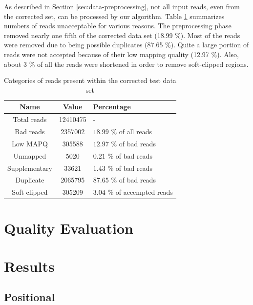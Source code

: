 As described in Section \ref{sec:data-preprocessing}, not all input reads, even from the corrected set, can be processed by our algorithm. Table \ref{tab:corrected-set-categories} summarizes numbers of reads unacceptable for various reasons. The preprocessing phase removed nearly one fifth of the corrected data set (18.99 \%). Most of the reads were removed due to being possible duplicates (87.65 \%). Quite a large portion of  reads were not accepted because of their low mapping quality (12.97 \%). Also, about 3 \% of all the reads were shortened in order to remove soft-clipped regions.

\begin{table}[h]
\begin{center}
\caption{Categories of reads present within the corrected test data set}
\label{tab:corrected-set-categories}
\begin{tabular}{| c | c | p{5cm} |}
\hline
Name & Value & Percentage \\
\hline
Total reads & 12410475 & - \\
\hline
Bad reads & 2357002  & $18.99$ \% of all reads \\
\hline
Low MAPQ & 305588 & $12.97$ \% of bad reads \\
\hline
Unmapped & 5020 & $0.21$ \% of bad reads \\
\hline
Supplementary & 33621 & $1.43$ \% of bad reads \\
\hline
Duplicate & 2065795 & $87.65$ \% of bad reads \\
\hline
Soft-clipped & 305209 & $3.04$ \% of accempted reads \\
\hline
\end{tabular}
\end{center}
\end{table}

\section{Quality Evaluation}
\label{sec:quality-evaulation}

\section{Results}
\label{sec:results}

\subsection{Positional}
\label{subsec:positional-results}

